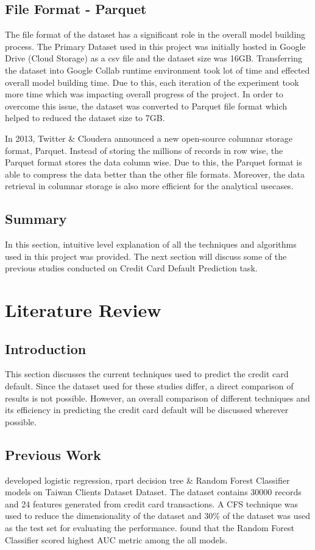 \documentclass[twoside,11pt,a4paper]{article}
\begin{document}
\subsection{File Format - Parquet}
The file format of the dataset has a significant role in the overall model building process. The Primary Dataset used in this project was initially hosted in Google Drive (Cloud Storage) as a csv file and the dataset size was 16GB. Transferring the dataset into Google Collab runtime environment took lot of time and effected overall model building time. Due to this, each iteration  of the experiment took more time which was impacting overall progress of the project. In order to overcome this issue, the dataset was converted to Parquet  file format which helped to reduced the dataset size to 7GB.

In 2013, Twitter \& Cloudera announced a new open-source columnar storage format, Parquet. Instead of storing the millions of records in row wise, the Parquet format stores the data column wise. Due to this, the Parquet format is able to compress the data better than the other file formats. Moreover, the data retrieval in columnar storage is also more efficient for the analytical usecases. 


\subsection{Summary}
In this section, intuitive level explanation of all the techniques and algorithms used in this project was provided. The next section will discuss some of the previous studies conducted on Credit Card Default Prediction task.
\vfill
\clearpage
\section{Literature Review}\label{sec:literature_review}
\subsection{Introduction}
This section discusses the current techniques used to predict the credit card default. Since the dataset used for these studies differ, a direct comparison of results is not possible. However, an overall comparison of different techniques and its efficiency in predicting the credit card default will be discussed wherever possible.

\subsection{Previous Work}
\citep{sayjadah2018credit} developed logistic regression, rpart decision tree \& Random Forest Classifier models on Taiwan Clients Dataset \citep{yeh2009comparisons} Dataset. The dataset contains 30000 records and 24 features generated from credit card transactions. A \acf{CFS} technique was used to reduce the dimensionality of the dataset and 30\% of the dataset was used as the test set for evaluating the performance. \citep{sayjadah2018credit} found that the Random Forest Classifier scored highest \acf{AUC} metric among the all models.\\
\end{document}
